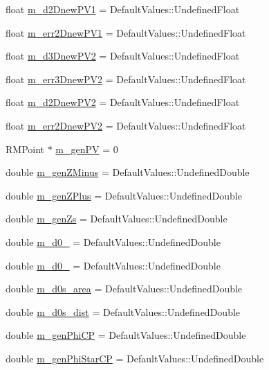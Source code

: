 \begin{DoxyCompactItemize}
\item 
float \hyperlink{classHttProduct_a5cd0dab7ec8daff69e1540b1436141f2}{m\_\-d2DnewPV1} = DefaultValues::UndefinedFloat
\item 
float \hyperlink{classHttProduct_ac4058691f0eab33136a5fcfd728e8e96}{m\_\-err2DnewPV1} = DefaultValues::UndefinedFloat
\item 
float \hyperlink{classHttProduct_aef4f07e87a2d4ca39749fb4c2b5e8f60}{m\_\-d3DnewPV2} = DefaultValues::UndefinedFloat
\item 
float \hyperlink{classHttProduct_acc86e1f479ff6ab8b9b7b7397b423437}{m\_\-err3DnewPV2} = DefaultValues::UndefinedFloat
\item 
float \hyperlink{classHttProduct_a0efa7a19a8e5b0e2129c91ae58cf24f4}{m\_\-d2DnewPV2} = DefaultValues::UndefinedFloat
\item 
float \hyperlink{classHttProduct_aabbc4184d62a6cd2b6e71d70eddda294}{m\_\-err2DnewPV2} = DefaultValues::UndefinedFloat
\item 
RMPoint $\ast$ \hyperlink{classHttProduct_a62c0b404f4cbf75e58a963c62466dadc}{m\_\-genPV} = 0
\item 
double \hyperlink{classHttProduct_a7da22d22be0ba3757a18a750846dd7f2}{m\_\-genZMinus} = DefaultValues::UndefinedDouble
\item 
double \hyperlink{classHttProduct_afe89f44a7b3f1740434a14a97f6ca420}{m\_\-genZPlus} = DefaultValues::UndefinedDouble
\item 
double \hyperlink{classHttProduct_a5faddab4b5f97fa2d558d451f6fa2ea7}{m\_\-genZs} = DefaultValues::UndefinedDouble
\item 
double \hyperlink{classHttProduct_a60b4a2e75cda48c95d74b39cfb2af593}{m\_\-d0\_} = DefaultValues::UndefinedDouble
\item 
double \hyperlink{classHttProduct_a0c1690a7af0dbfe2784f9a0987faeff3}{m\_\-d0\_} = DefaultValues::UndefinedDouble
\item 
double \hyperlink{classHttProduct_afa36e40279c564966ba388f4387d1cb4}{m\_\-d0s\_\-area} = DefaultValues::UndefinedDouble
\item 
double \hyperlink{classHttProduct_aef0897c87944ba5924db4f50b37f9822}{m\_\-d0s\_\-dist} = DefaultValues::UndefinedDouble
\item 
double \hyperlink{classHttProduct_a5462fd77ffc176948b012b32406dd4f3}{m\_\-genPhiCP} = DefaultValues::UndefinedDouble
\item 
double \hyperlink{classHttProduct_a080bded07e8508ff0e09577f95340002}{m\_\-genPhiStarCP} = DefaultValues::UndefinedDouble

\end{DoxyCompactItemize}
